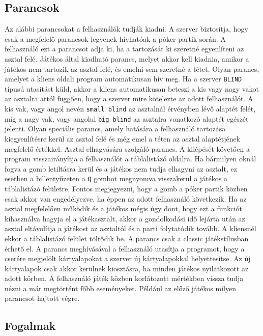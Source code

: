 \subsection{Parancsok}
Az alábbi parancsokat a felhasználók tudják kiadni. A szerver biztosítja, hogy csak a megfelelő parancsok legyenek hívhatóak a póker partik során.
A felhasználó ezt a parancsot adja ki, ha a tartozását ki szeretné egyenlíteni az asztal felé.
Játékos által kiadható parancs, melyet akkor kell kiadnia, amikor a játékos nem tartozik az asztal felé, és emelni sem szeretné a tétet.
Olyan parancs, amelyet a kliens oldali program automatikusan hív meg. Ha a szerver \texttt{BLIND} típusú utasítást küld, akkor a kliens automatikusan beteszi a kis vagy nagy vakot az asztalra attól függően, hogy a szerver mire kötelezte az adott felhasználót. A kis vak, vagy angol nevén \texttt{small blind} az asztalnál érvényben lévő alaptét felét, míg a nagy vak, vagy angolul \texttt{big blind} az asztalra vonatkozó alaptét egészét jelenti.
Olyan speciális parancs, amely hatására a felhasználó tartozása kiegyenlítésre kerül az asztal felé és még emel a téten az asztal alaptétjének megfelelő értékkel.
Asztal elhagyására szolgáló parancs. A kilépését követően a program visszairányítja a felhasználót a táblalistázó oldalra. Ha bármilyen oknál fogva a gomb letiltásra kerül és a játékos nem tudja elhagyni az asztalt, ez esetben a billentyűzeten a \texttt{Q} gombot megnyomva visszakerül a játékos a táblalistázó felületre. Fontos megjegyezni, hogy a gomb a póker partik közben csak akkor van engedélyezve, ha éppen az adott felhasználó következik. Ha az asztal megfelelően működik és a játékos mégis úgy dönt, hogy ezt a funkciót kihasználva hagyja el a játékasztalt, akkor a gondolkodási idő lejárta után az asztal eltávolítja a játékost az asztaltól és a parti folytatódik tovább. A kliensnél ekkor a táblalistázó felület töltődik be.
A parancs csak a classic játékstílusban érhető el. A parancs meghívásával a felhasználó utasítja a programot, hogy a cserére megjelölt kártyalapokat a szerver új kártyalapokkal helyettesítse. Az új kártyalapok csak akkor kerülnek kiosztásra, ha minden játékos nyilatkozott az adott körben.
A felhasználó játék közben korlátozott mértékben vissza tudja nézni a már megtörtént főbb eseményeket. Például az előző játékos milyen parancsot hajtott végre.
\subsection{Fogalmak}

